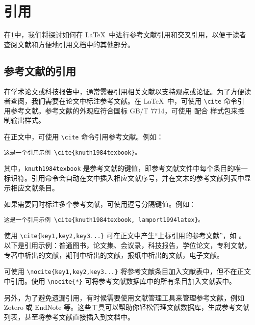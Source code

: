 \section{引用}\label{sec:reference}

在\cref{sec:reference}中，我们将探讨如何在 \LaTeX\ 中进行参考文献引用和交叉引用，以便于读者查阅文献和方便地引用文档中的其他部分。

\subsection{参考文献的引用}

在学术论文或科技报告中，通常需要引用相关文献以支持观点或论证。为了方便读者查阅，我们需要在论文中标注参考文献。在 \LaTeX\ 中，可使用 \verb|\cite| 命令引用参考文献。参考文献的外观应符合国标 GB/T 7714，可使用 \BibLaTeX{} 配合  样式包来控制输出样式。

在正文中，可使用 \verb|\cite| 命令引用参考文献。例如：

\begin{verbatim}
这是一个引用示例 \cite{knuth1984texbook}。
\end{verbatim}

其中，\verb|knuth1984texbook| 是参考文献的键值，即参考文献文件中每个条目的唯一标识符。引用命令会自动在文中插入相应文献序号，并在文末的参考文献列表中显示相应文献条目。

如果需要同时标注多个参考文献，可使用逗号分隔键值。例如：

\begin{verbatim}
这是一个引用示例 \cite{knuth1984texbook, lamport1994latex}。
\end{verbatim}

使用 \verb|\cite{key1,key2,key3...}| 可在正文中产生“上标引用的参考文献”，如 \cite{harrypotter,deeplearning,internet}。以下是引用示例：普通图书\cite{harrypotter,crackingthecodinginterview}，论文集、会议录\cite{icml}，科技报告\cite{internet,google}，学位论文\cite{quantumcomputing,neuralnetworks}，专利文献\cite{siri,tesla}，专著中析出的文献\cite{machinelearning}，期刊中析出的文献\cite{artificialintelligence,wikipedia}，报纸中析出的文献\cite{trump}，电子文献\cite{stanford,crackingthecodinginterview}。

可使用 \verb|\nocite{key1,key2,key3...}| 将参考文献条目加入文献表中，但不在正文中引用。使用 \verb|\nocite{*}| 可将参考文献数据库中的所有条目加入文献表中。

另外，为了避免遗漏引用，有时候需要使用文献管理工具来管理参考文献，例如 Zotero 或 EndNote 等。这些工具可以帮助你轻松管理文献数据库，生成参考文献列表，甚至将参考文献直接插入到文档中。


